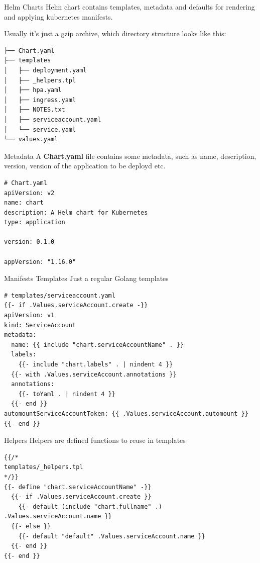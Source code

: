 \documentclass[11pt, aspectratio=169]{beamer}
\begin{document}
\begin{frame}[fragile]{ Helm Charts}
	Helm chart contains templates, metadata and defaults for rendering and applying
	kubernetes manifests.

	Usually it's just a gzip archive, which directory structure looks like this:

	\begin{verbatim}
├── Chart.yaml
├── templates
│   ├── deployment.yaml
│   ├── _helpers.tpl
│   ├── hpa.yaml
│   ├── ingress.yaml
│   ├── NOTES.txt
│   ├── serviceaccount.yaml
│   └── service.yaml
└── values.yaml
	\end{verbatim}
\end{frame}

\begin{frame}[fragile]{ Metadata}
	A \textbf{Chart.yaml} file contains some metadata, such as name, description,
	version, version of the application to be deployd etc.
	\begin{verbatim}
# Chart.yaml
apiVersion: v2
name: chart
description: A Helm chart for Kubernetes
type: application

version: 0.1.0

appVersion: "1.16.0"
	\end{verbatim}
\end{frame}

\begin{frame}[fragile]{ Manifests Templates}
	Just a regular Golang templates
	\begin{verbatim}
# templates/serviceaccount.yaml
{{- if .Values.serviceAccount.create -}}
apiVersion: v1
kind: ServiceAccount
metadata:
  name: {{ include "chart.serviceAccountName" . }}
  labels:
    {{- include "chart.labels" . | nindent 4 }}
  {{- with .Values.serviceAccount.annotations }}
  annotations:
    {{- toYaml . | nindent 4 }}
  {{- end }}
automountServiceAccountToken: {{ .Values.serviceAccount.automount }}
{{- end }}
	\end{verbatim}
\end{frame}

\begin{frame}[fragile]{ Helpers}
	Helpers are defined functions to reuse in templates
	\begin{verbatim}
{{/*
templates/_helpers.tpl
*/}}
{{- define "chart.serviceAccountName" -}}
  {{- if .Values.serviceAccount.create }}
    {{- default (include "chart.fullname" .) .Values.serviceAccount.name }}
  {{- else }}
    {{- default "default" .Values.serviceAccount.name }}
  {{- end }}
{{- end }}
	\end{verbatim}
\end{frame}
\end{document}
